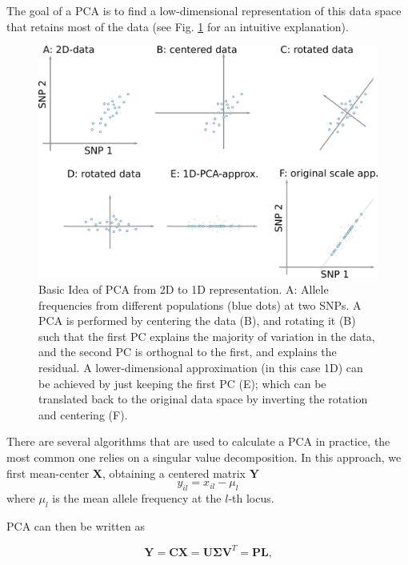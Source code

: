 \documentclass[12pt,a4pape, fullpage]{article}
\newcommand{\MX}{\mathbf{X}} %
\newcommand{\MC}{\mathbf{C}} %
\newcommand{\MY}{\mathbf{Y}} %
\newcommand{\MP}{\mathbf{P}} %
\newcommand{\ML}{\mathbf{L}} %
\newcommand{\MSINGULAR}{\mathbf{\Sigma}} %
\begin{document}
	The goal of a PCA is to find a low-dimensional representation of this data space that retains most of the data (see Fig. \ref{fig:pca_explanation} for an intuitive explanation). 
	
	\begin{figure}
		\includegraphics[width=\textwidth]{pca_explanation.png}
		\caption{Basic Idea of PCA from 2D to 1D representation. A: Allele frequencies from different populations (blue dots) at two SNPs. A PCA is performed by centering the data (B), and rotating it (B) such that the first PC explains the majority of variation in the data, and the second PC is orthognal to the first, and explains the residual. A lower-dimensional approximation (in this case 1D) can be achieved by just keeping the first PC (E); which can be translated back to the original data space by inverting the rotation and centering (F).}
		\label{fig:pca_explanation}
	\end{figure}
	
	There are several algorithms that are used to calculate a PCA in practice, the most common one relies on a singular value decomposition. In this approach, we first mean-center $\MX$, obtaining a centered matrix $\MY$
	\begin{equation}
	y_{il} = x_{il} - \mu_l
	\end{equation}
	where $\mu_l$ is the mean allele frequency at the $l$-th locus.
	
	PCA can then be written as
	
	\begin{equation}
	\MY = \MC\MX = \mathbf{U} \MSINGULAR \mathbf{V}^T = \MP\ML\text{,}
	\end{equation}
	
\end{document}
